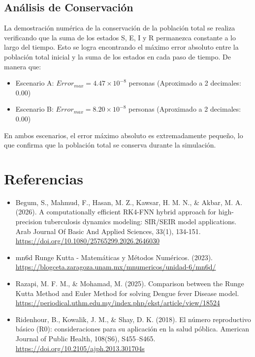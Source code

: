 \documentclass[12pt]{article}
\begin{document}
        \subsection{Análisis de Conservación}

        La demostración numérica de la conservación de la población total se realiza verificando que la suma de los estados S, E, I y R permanezca constante a lo largo del tiempo. Esto se logra encontrando el máximo error absoluto entre la población total inicial y la suma de los estados en cada paso de tiempo. De manera que:

        \begin{itemize}
            \item Escenario A: $Error_{max} = 4.47\times10^{-8}$ personas (Aproximado a 2 decimales: 0.00)
            \item Escenario B: $Error_{max} = 8.20\times10^{-8}$ personas (Aproximado a 2 decimales: 0.00)
        \end{itemize}
        
        En ambos escenarios, el error máximo absoluto es extremadamente pequeño, lo que confirma que la población total se conserva durante la simulación.

    \newpage

    \section{Referencias}
    \begin{itemize}
        \item Begum, S., Mahmud, F., Hasan, M. Z., Kawsar, H. M. N., \& Akbar, M. A. (2026). A computationally efficient RK4-FNN hybrid approach for high-precision tuberculosis dynamics modeling: SIR/SEIR model applications. Arab Journal Of Basic And Applied Sciences, 33(1), 134-151. \newline \url{https://doi.org/10.1080/25765299.2026.2646030}
        \item mn6d Runge Kutta - Matemáticas y Métodos Numéricos. (2023). \newline \url{https://blogceta.zaragoza.unam.mx/mnumericos/unidad-6/mn6d/}
        \item Razapi, M. F. M., \& Mohamad, M. (2025). Comparison between the Runge Kutta Method and Euler Method for solving Dengue fever Disease model. \newline \url{https://periodical.uthm.edu.my/index.php/ekst/article/view/18524}
        \item Ridenhour, B., Kowalik, J. M., \& Shay, D. K. (2018). El número reproductivo básico (R0): consideraciones para su aplicación en la salud póblica. American Journal of Public Health, 108(S6), S455–S465. \newline \url{https://doi.org/10.2105/ajph.2013.301704s}
    \end{itemize}
\end{document}

